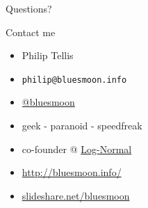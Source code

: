 \documentclass{beamer}
\begin{document}
\begin{frame}{}
  \begin{center}
  \LARGE Questions?
  \end{center}
\end{frame}

\begin{frame}{Contact me}
  \begin{itemize}
  \item Philip Tellis
  \item \small{\texttt{philip@bluesmoon.info}}
  \item \href{http://twitter.com/bluesmoon}{@bluesmoon}
  \item geek - paranoid - speedfreak
  \item co-founder @ \href{http://www.lognormal.com/}{Log-Normal}
  \item \href{http://bluesmoon.info/}{http://bluesmoon.info/}
  \item \href{http://www.slideshare.net/bluesmoon}{slideshare.net/bluesmoon}
  \end{itemize}
\end{frame}
\end{document}
